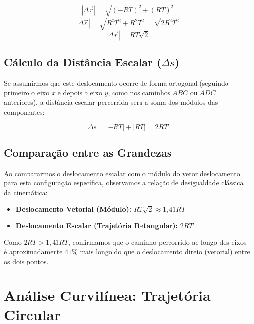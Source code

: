 \documentclass[11pt,a4paper]{article}
\begin{document}
$$|\Delta \vec{r}| = \sqrt{(-RT)^2 + (RT)^2}$$
$$|\Delta \vec{r}| = \sqrt{R^2 T^2 + R^2 T^2} = \sqrt{2 R^2 T^2}$$
$$|\Delta \vec{r}| = RT\sqrt{2}$$

\subsection{Cálculo da Distância Escalar ($\Delta s$)}
Se assumirmos que este deslocamento ocorre de forma ortogonal (seguindo primeiro o eixo $x$ e depois o eixo $y$, como nos caminhos $ABC$ ou $ADC$ anteriores), a distância escalar percorrida será a soma dos módulos das componentes:

$$\Delta s = | -RT | + | RT | = 2RT$$

\subsection{Comparação entre as Grandezas}
Ao compararmos o deslocamento escalar com o módulo do vetor deslocamento para esta configuração específica, observamos a relação de desigualdade clássica da cinemática:

\begin{itemize}
    \item \textbf{Deslocamento Vetorial (Módulo):} $RT\sqrt{2} \approx 1,41 RT$
    \item \textbf{Deslocamento Escalar (Trajetória Retangular):} $2 RT$
\end{itemize}

Como $2RT > 1,41RT$, confirmamos que o caminho percorrido ao longo dos eixos é aproximadamente $41\%$ mais longo do que o deslocamento direto (vetorial) entre os dois pontos.

\begin{center}
\end{center}


\section{Análise Curvilínea: Trajetória Circular}
\end{document}
